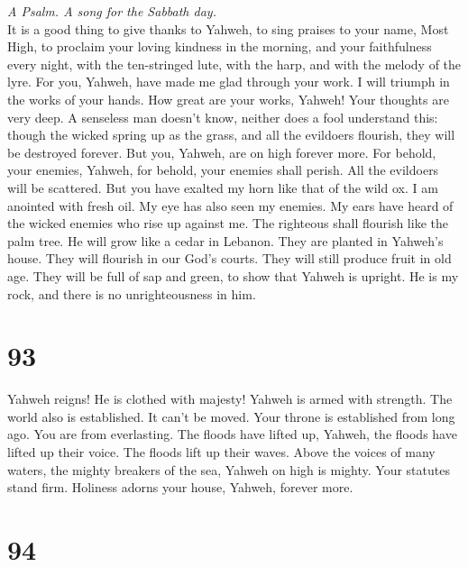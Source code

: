\emph{A Psalm. A song for the Sabbath day.}\\
 It is a good thing to give thanks to Yahweh, to sing
praises to your name, Most High,  to proclaim your loving
kindness in the morning, and your faithfulness every night,
 with the ten-stringed lute, with the harp, and with the
melody of the lyre.  For you, Yahweh, have made me glad
through your work. I will triumph in the works of your hands.
 How great are your works, Yahweh! Your thoughts are very
deep.  A senseless man doesn't know, neither does a fool
understand this:  though the wicked spring up as the
grass, and all the evildoers flourish, they will be destroyed forever.
 But you, Yahweh, are on high forever more. 
For behold, your enemies, Yahweh, for behold, your enemies shall perish.
All the evildoers will be scattered.  But you have
exalted my horn like that of the wild ox. I am anointed with fresh oil.
 My eye has also seen my enemies. My ears have heard of
the wicked enemies who rise up against me.  The righteous
shall flourish like the palm tree. He will grow like a cedar in Lebanon.
 They are planted in Yahweh's house. They will flourish
in our God's courts.  They will still produce fruit in
old age. They will be full of sap and green,  to show
that Yahweh is upright. He is my rock, and there is no unrighteousness
in him.

\hypertarget{section-92}{%
\section{93}\label{section-92}}

 Yahweh reigns! He is clothed with majesty! Yahweh is
armed with strength. The world also is established. It can't be moved.
 Your throne is established from long ago. You are from
everlasting.  The floods have lifted up, Yahweh, the
floods have lifted up their voice. The floods lift up their waves.
 Above the voices of many waters, the mighty breakers of
the sea, Yahweh on high is mighty.  Your statutes stand
firm. Holiness adorns your house, Yahweh, forever more.

\hypertarget{section-93}{%
\section{94}\label{section-93}}


